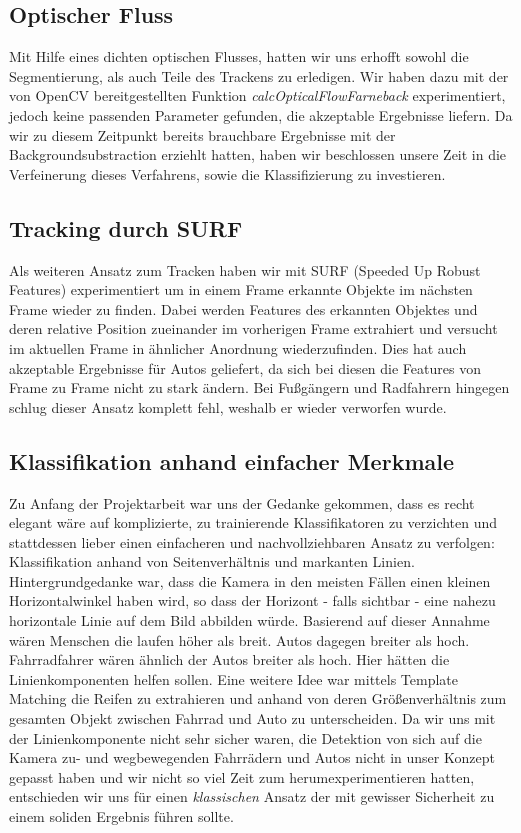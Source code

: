\documentclass[conference]{IEEEtran}
\begin{document}
\subsection{Optischer Fluss}
Mit Hilfe eines dichten optischen Flusses, hatten wir uns erhofft sowohl die Segmentierung, als auch Teile des Trackens zu erledigen. Wir haben dazu mit der von OpenCV bereitgestellten Funktion \textit{calcOpticalFlowFarneback} experimentiert, jedoch keine passenden Parameter gefunden, die akzeptable Ergebnisse liefern. Da wir zu diesem Zeitpunkt bereits brauchbare Ergebnisse mit der Backgroundsubstraction erziehlt hatten, haben wir beschlossen unsere Zeit in die Verfeinerung dieses Verfahrens, sowie die Klassifizierung zu investieren. 
\subsection{Tracking durch SURF}
Als weiteren Ansatz zum Tracken haben wir mit SURF (Speeded Up Robust Features) experimentiert um in einem Frame erkannte Objekte im nächsten Frame wieder zu finden. Dabei werden Features des erkannten Objektes und deren relative Position zueinander im vorherigen Frame extrahiert und versucht im aktuellen Frame in ähnlicher Anordnung wiederzufinden. Dies hat auch akzeptable Ergebnisse für Autos geliefert, da sich bei diesen die Features von Frame zu Frame nicht zu stark ändern. Bei Fußgängern und Radfahrern hingegen schlug dieser Ansatz komplett fehl, weshalb er wieder verworfen wurde.

\subsection{Klassifikation anhand einfacher Merkmale}

Zu Anfang der Projektarbeit war uns der Gedanke gekommen, dass es recht elegant wäre auf komplizierte, zu trainierende Klassifikatoren zu verzichten und stattdessen lieber einen einfacheren und nachvollziehbaren Ansatz zu verfolgen: Klassifikation anhand von Seitenverhältnis und markanten Linien. Hintergrundgedanke war, dass die Kamera in den meisten Fällen einen kleinen Horizontalwinkel haben wird, so dass der Horizont - falls sichtbar - eine nahezu horizontale Linie auf dem Bild abbilden würde. Basierend auf dieser Annahme wären Menschen die laufen höher als breit. Autos dagegen breiter als hoch. Fahrradfahrer wären ähnlich der Autos breiter als hoch. Hier hätten die Linienkomponenten helfen sollen. Eine weitere Idee war mittels Template Matching die Reifen zu extrahieren und anhand von deren Größenverhältnis zum gesamten Objekt zwischen Fahrrad und Auto zu unterscheiden.
Da wir uns mit der Linienkomponente nicht sehr sicher waren, die Detektion von sich auf die Kamera zu- und wegbewegenden Fahrrädern und Autos nicht in unser Konzept gepasst haben und wir nicht so viel Zeit zum herumexperimentieren hatten, entschieden wir uns für einen \textit{klassischen} Ansatz der mit gewisser Sicherheit zu einem soliden Ergebnis führen sollte.
\end{document}
